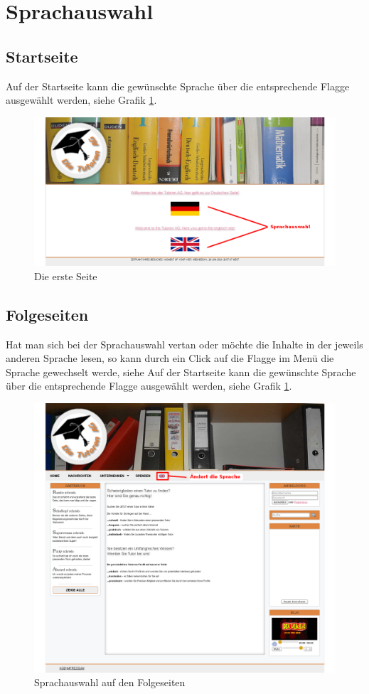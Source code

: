 
\section{Sprachauswahl}

\subsection{Startseite}

Auf der Startseite kann die gewünschte Sprache über die entsprechende Flagge ausgewählt werden, siehe Grafik \ref{fig:startseite}.

\begin{figure}[!htbp]
 \centering
 \includegraphics[width=1\textwidth]{../Screenshots/startseite}
 \caption{Die erste Seite}
 \label{fig:startseite}
\end{figure}

\newpage

\subsection{Folgeseiten}

Hat man sich bei der Sprachauswahl vertan oder möchte die Inhalte in der jeweils anderen Sprache lesen, so kann durch ein Click auf die Flagge im Menü die Sprache gewechselt werde, siehe
Auf der Startseite kann die gewünschte Sprache über die entsprechende Flagge ausgewählt werden, siehe Grafik \ref{fig:startseite}.

\begin{figure}[!htbp]
 \centering
 \includegraphics[width=1\textwidth]{../Screenshots/de/sprachauswahl}
 \caption{Sprachauswahl auf den Folgeseiten}
 \label{fig:sprachauswahl}
\end{figure}
